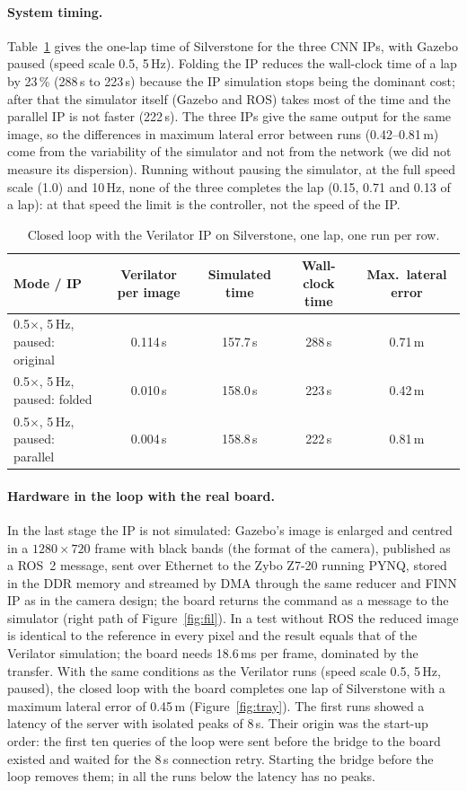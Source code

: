 \documentclass{article}
\begin{document}
\paragraph{System timing.}
Table~\ref{tab:sys} gives the one-lap time of Silverstone for the three CNN IPs, with Gazebo paused (speed scale 0.5, 5\,Hz). Folding the IP reduces the wall-clock time of a lap by 23\,\%
(288\,s to 223\,s) because the IP simulation stops being the dominant cost; after that the simulator itself (Gazebo and ROS) takes most of the time and the parallel IP is not faster (222\,s).
The three IPs give the same output for the same image, so the differences in maximum lateral error between runs (0.42--0.81\,m) come from the variability of the simulator
and not from the network (we did not measure its dispersion). Running without pausing the simulator, at the full speed scale (1.0) and 10\,Hz, none of the three completes the lap
(0.15, 0.71 and 0.13 of a lap): at that speed the limit is the controller, not the speed of the IP.
\begin{table}[h]
\centering
\caption{Closed loop with the Verilator IP on Silverstone, one lap, one run per row.}
\label{tab:sys}
\begin{tabular}{lcccc}
\toprule
Mode / IP & Verilator per image & Simulated time & Wall-clock time & Max.\ lateral error\\
\midrule
0.5$\times$, 5\,Hz, paused: original & 0.114\,s & 157.7\,s & 288\,s & 0.71\,m\\
0.5$\times$, 5\,Hz, paused: folded & 0.010\,s & 158.0\,s & 223\,s & 0.42\,m\\
0.5$\times$, 5\,Hz, paused: parallel & 0.004\,s & 158.8\,s & 222\,s & 0.81\,m\\
\bottomrule
\end{tabular}
\end{table}

\paragraph{Hardware in the loop with the real board.}
In the last stage the IP is not simulated: Gazebo's image is enlarged and centred in a $1280{\times}720$ frame with black bands (the format of the camera), published as a ROS~2 message,
sent over Ethernet to the Zybo Z7-20 running PYNQ, stored in the DDR memory and streamed by DMA through the same reducer and FINN IP as in the camera design;
the board returns the command as a message to the simulator (right path of Figure~\ref{fig:fil}). In a test without ROS the reduced image is identical to the reference in every pixel and the
result equals that of the Verilator simulation; the board needs 18.6\,ms per frame, dominated by the transfer. With the same conditions as the Verilator runs (speed scale 0.5, 5\,Hz, paused),
the closed loop with the board completes one lap of Silverstone with a maximum lateral error of 0.45\,m (Figure~\ref{fig:tray}).
The first runs showed a latency of the server with isolated peaks of 8\,s. Their origin was the start-up order: the first ten queries of the loop were sent before the bridge to the board
existed and waited for the 8\,s connection retry. Starting the bridge before the loop removes them; in all the runs below the latency has no peaks.
\end{document}
